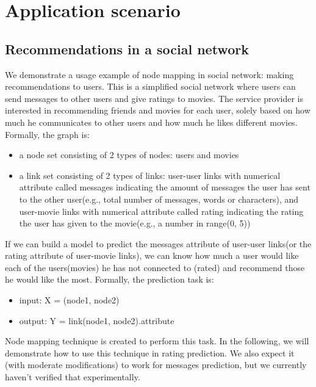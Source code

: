 \documentclass{article}
\begin{document}
\section{Application scenario}

\subsection{Recommendations in a social network}
We demonstrate a usage example of node mapping in social network: making 
recommendations to users.
This is a simplified social network where users can send messages to other 
users and give ratings to movies.
The service provider is interested in recommending friends and movies for each 
user, solely based on how much he communicates to other users and how much 
he likes different movies.
Formally, the graph is:
\begin{itemize}
	\item a node set consisting of 2 types of nodes: users and movies
	\item a link set consisting of 2 types of links: user-user links with 
	numerical attribute called messages indicating the amount of messages the 
	user has sent to the other 	user(e.g., total number of messages, words 
	or characters),
	and user-movie links with numerical attribute called rating indicating the 
	rating the user has given to the movie(e.g., a number in range(0, 5))
\end{itemize}
If we can build a model to predict the messages attribute of user-user links(or 
the rating attribute of user-movie links), we can know how much a user would 
like each of the users(movies) he has not connected to (rated) and recommend 
those he would like the most.
Formally, the prediction task is:
\begin{itemize}
	\item input: X = (node1, node2)
	\item output: Y = link(node1, node2).attribute
\end{itemize}
Node mapping technique is created to perform this task. In the following, we 
will demonstrate how to use this technique in rating prediction. We also expect 
it (with moderate modifications) to work for messages prediction, but we 
currently haven't verified that experimentally.
\end{document}
